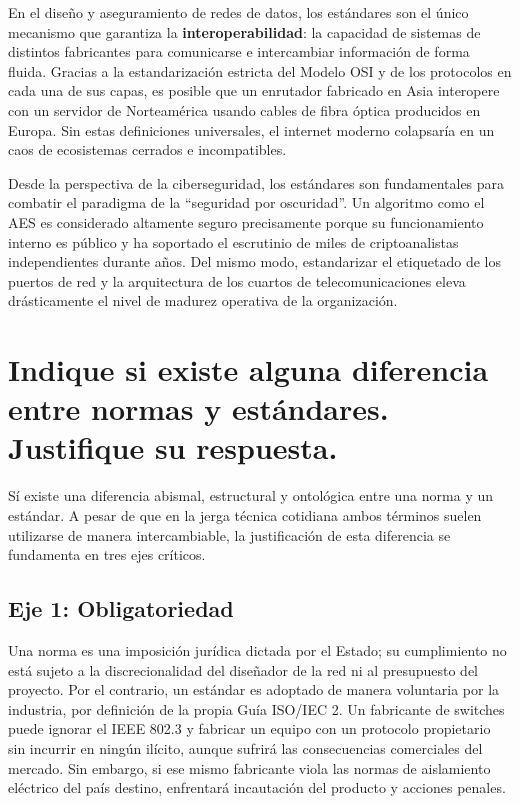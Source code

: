 \documentclass[a4paper,12pt]{article}
\begin{document}
En el diseño y aseguramiento de redes de datos, los estándares son el único mecanismo que garantiza la \textbf{interoperabilidad}: la capacidad de sistemas de distintos fabricantes para comunicarse e intercambiar información de forma fluida. Gracias a la estandarización estricta del Modelo OSI y de los protocolos en cada una de sus capas, es posible que un enrutador fabricado en Asia interopere con un servidor de Norteamérica usando cables de fibra óptica producidos en Europa. Sin estas definiciones universales, el internet moderno colapsaría en un caos de ecosistemas cerrados e incompatibles.

Desde la perspectiva de la ciberseguridad, los estándares son fundamentales para combatir el paradigma de la ``seguridad por oscuridad''. Un algoritmo como el AES es considerado altamente seguro precisamente porque su funcionamiento interno es público y ha soportado el escrutinio de miles de criptoanalistas independientes durante años. Del mismo modo, estandarizar el etiquetado de los puertos de red y la arquitectura de los cuartos de telecomunicaciones eleva drásticamente el nivel de madurez operativa de la organización.

\newpage

\section{Indique si existe alguna diferencia entre normas y estándares. Justifique su respuesta.}

Sí existe una diferencia abismal, estructural y ontológica entre una norma y un estándar. A pesar de que en la jerga técnica cotidiana ambos términos suelen utilizarse de manera intercambiable, la justificación de esta diferencia se fundamenta en tres ejes críticos.

\subsection*{Eje 1: Obligatoriedad}

Una norma es una imposición jurídica dictada por el Estado; su cumplimiento no está sujeto a la discrecionalidad del diseñador de la red ni al presupuesto del proyecto. Por el contrario, un estándar es adoptado de manera voluntaria por la industria, por definición de la propia Guía ISO/IEC 2. Un fabricante de switches puede ignorar el IEEE 802.3 y fabricar un equipo con un protocolo propietario sin incurrir en ningún ilícito, aunque sufrirá las consecuencias comerciales del mercado. Sin embargo, si ese mismo fabricante viola las normas de aislamiento eléctrico del país destino, enfrentará incautación del producto y acciones penales.
\end{document}
